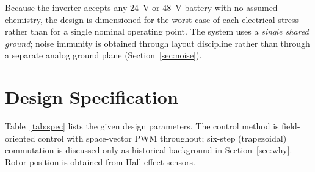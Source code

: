 \documentclass[journal,onecolumn,11pt]{IEEEtran}
\begin{document}
Because the inverter accepts any \SI{24}{\volt} or \SI{48}{\volt} battery with no assumed
chemistry, the design is dimensioned for the worst case of each electrical stress rather than for
a single nominal operating point. The system uses a \emph{single shared ground}; noise immunity is
obtained through layout discipline rather than through a separate analog ground plane
(Section~\ref{sec:noise}).

\section{Design Specification}\label{sec:spec}

Table~\ref{tab:spec} lists the given design parameters. The control method is field-oriented
control with space-vector PWM throughout; six-step (trapezoidal) commutation is discussed only as
historical background in Section~\ref{sec:why}. Rotor position is obtained from Hall-effect
sensors.
\end{document}
